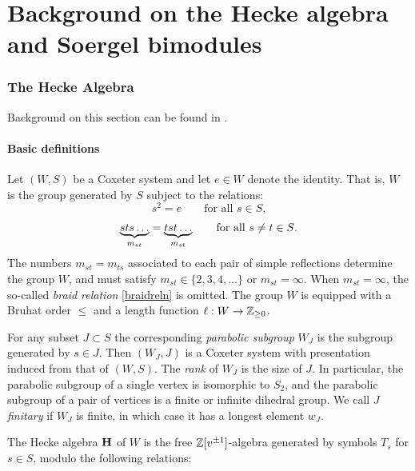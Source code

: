 
\part{Background on the Hecke algebra and Soergel bimodules}

\label{pt:background}

\section{The Hecke Algebra}
\label{sec-hecke}

Background on this section can be found in \cite{Humphreys}.

\subsection{Basic definitions}
\label{subsec-basicdefinition}

Let $(W,S)$ be a Coxeter system and let $e \in W$ denote the identity. That is, $W$ is the group generated by $S$ subject to the relations:
\begin{equation} s^2=e   
\qquad \text{for all $s \in S$,}\end{equation}
\begin{equation} \underbrace{sts\ldots}_{m_{st}} = \underbrace{tst\ldots}_{m_{st}}
\label{braidreln} 
\qquad \text{for all $s \ne t \in S$.}
\end{equation}
The numbers $m_{st} = m_{ts}$ associated to each pair of simple reflections determine the group $W$, and must satisfy $m_{st} \in \{2,3,4,\ldots\}$ or $m_{st}=\infty$. When $m_{st}=\infty$, the
so-called \emph{braid relation} \eqref{braidreln} is omitted. The group $W$ is equipped with a Bruhat order $\le$ and a length function $\ell : W \rightarrow {\mathbb{Z}}_{\ge 0}$.

For any subset $J \subset S$ the corresponding \emph{parabolic subgroup} $W_J$ is the subgroup generated by $s \in J$. Then $(W_J, J)$ is a Coxeter system with presentation induced
from that of $(W,S)$. The \emph{rank} of $W_J$ is the size of $J$. In particular, the parabolic subgroup of a single vertex is isomorphic to $S_2$, and the parabolic subgroup of a pair of
vertices is a finite or infinite dihedral group. We call $J$ \emph{finitary} if $W_J$ is finite, in which case it has a longest element $w_J$.

The Hecke algebra ${\mathbf H}$ of $W$ is the free ${\mathbb{Z}}[v^{\pm 1}]$-algebra generated by symbols $T_s$ for $s \in S$, modulo the following relations:

